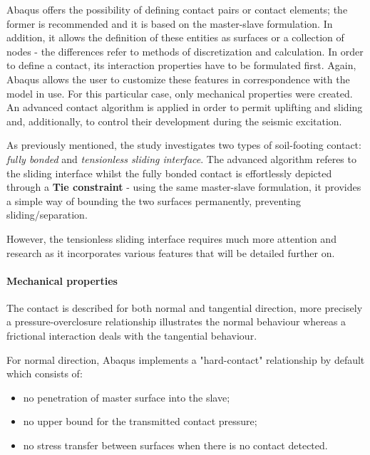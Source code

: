 Abaqus offers the possibility of defining contact pairs or contact elements; the former is recommended and it is based on the master-slave formulation. In addition, it allows the definition of these entities as surfaces or a collection of nodes - the differences refer to methods of discretization and calculation. In order to define a contact, its interaction properties have to be formulated first. Again, Abaqus allows the user to customize these features in correspondence with the model in use. For this particular case, only mechanical properties were created. An advanced contact algorithm is applied in order to permit uplifting and sliding and, additionally, to control their development during the seismic excitation. 

As previously mentioned, the study investigates two types of soil-footing contact: \textit{fully bonded} and \textit{tensionless sliding interface}. The advanced algorithm referes to the sliding interface whilst the fully bonded contact is effortlessly depicted through a \textbf{Tie constraint} - using the same master-slave formulation, it provides a simple way of bounding the two surfaces permanently, preventing sliding/separation.

However, the tensionless sliding interface requires much more attention and research as it incorporates various features that will be detailed further on.
 
\paragraph{Mechanical properties}   
The contact is described for both normal and tangential direction, more precisely a pressure-overclosure relationship illustrates the normal behaviour whereas a frictional interaction deals with the tangential behaviour. 

For normal direction, Abaqus implements a "hard-contact" relationship by default which consists of:
\begin{itemize}
	\item no penetration of master surface into the slave;
	\item no upper bound for the transmitted contact pressure;
	\item no stress transfer between surfaces when there is no contact detected.
\end{itemize}

